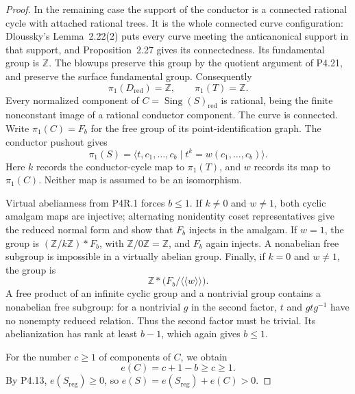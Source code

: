 \begin{proof}
In the remaining case the support of the conductor is
a connected rational cycle with attached rational trees.
It is the whole connected curve configuration: Dloussky's
Lemma~2.22(2) puts every curve meeting the anticanonical
support in that support, and Proposition~2.27 gives its
connectedness. Its fundamental group is $\mathbb Z$.
The blowups preserve this group by the quotient argument
of P4.21, and preserve the surface fundamental group.
Consequently
\[
 \pi_1(D_{\mathrm{red}})=\mathbb Z,\qquad
 \pi_1(T)=\mathbb Z.
\]
Every normalized component of
$C=\operatorname{Sing}(S)_{\mathrm{red}}$ is rational,
being the finite nonconstant image of a rational conductor
component. The curve is connected. Write $\pi_1(C)=F_b$
for the free group of its point-identification graph.
The conductor pushout gives
\[
 \pi_1(S)=
 \langle t,c_1,\ldots,c_b\mid t^k=w(c_1,\ldots,c_b)\rangle.
\]
Here $k$ records the conductor-cycle map to $\pi_1(T)$,
and $w$ records its map to $\pi_1(C)$. Neither map is
assumed to be an isomorphism.

Virtual abelianness from P4R.1 forces $b\le1$.
If $k\ne0$ and $w\ne1$, both cyclic amalgam maps are
injective; alternating nonidentity coset representatives
give the reduced normal form and show that $F_b$ injects
in the amalgam. If $w=1$, the group is
$(\mathbb Z/k\mathbb Z)*F_b$, with
$\mathbb Z/0\mathbb Z=\mathbb Z$, and $F_b$ again
injects. A nonabelian free subgroup is impossible in a
virtually abelian group. Finally, if $k=0$ and $w\ne1$,
the group is
\[
 \mathbb Z*\bigl(F_b/\langle\!\langle w\rangle\!\rangle\bigr).
\]
A free product of an infinite cyclic group and a nontrivial
group contains a nonabelian free subgroup: for a nontrivial
$g$ in the second factor, $t$ and $gtg^{-1}$ have no
nonempty reduced relation. Thus the second factor must
be trivial. Its abelianization has rank at least $b-1$,
which again gives $b\le1$.

For the number $c\ge1$ of components of $C$, we obtain
\[
 e(C)=c+1-b\ge c\ge1.
\]
By P4.13, $e(S_{\mathrm{reg}})\ge0$, so
$e(S)=e(S_{\mathrm{reg}})+e(C)>0$.
\end{proof}
